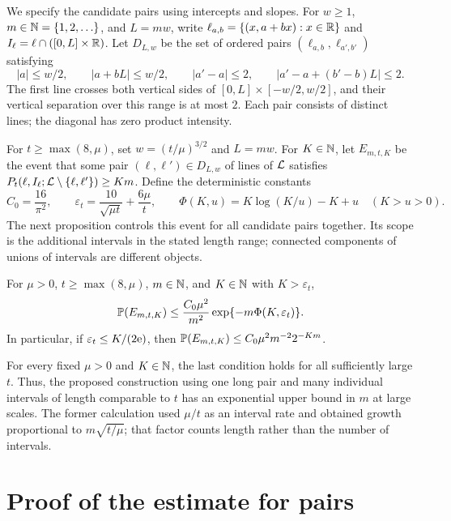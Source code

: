 \documentclass[11pt,letterpaper]{article}
\begin{document}
We specify the candidate pairs using intercepts and slopes. For $w\ge1$, $m\in\N=\{1,2,\ldots\}$, and $L=mw$, write $\ell_{a,b}=\{(x,a+bx):x\in\R\}$ and $I_\ell=\ell\cap([0,L]\times\R)$. Let $D_{L,w}$ be the set of ordered pairs $(\ell_{a,b},\ell_{a',b'})$ satisfying
\begin{equation}\label{eq:pairs}
 |a|\le w/2,\qquad |a+bL|\le w/2,\qquad
 |a'-a|\le2,\qquad |a'-a+(b'-b)L|\le2.
\end{equation}
The first line crosses both vertical sides of $[0,L]\times[-w/2,w/2]$, and their vertical separation over this range is at most $2$. Each pair consists of distinct lines; the diagonal has zero product intensity.

For $t\ge\max(8,\mu)$, set $w=(t/\mu)^{3/2}$ and $L=mw$. For $K\in\N$, let $E_{m,t,K}$ be the event that some pair $(\ell,\ell')\in D_{L,w}$ of lines of $\cL$ satisfies $P_t(\ell,I_\ell;\cL\setminus\{\ell,\ell'\})\ge Km$. Define the deterministic constants
\[
 C_0=\frac{16}{\pi^2},\qquad
 \varepsilon_t=\frac{10}{\sqrt{\mu t}}+\frac{6\mu}{t},\qquad
 \Phi(K,u)=K\log(K/u)-K+u\quad (K>u>0).
\]
The next proposition controls this event for all candidate pairs together. Its scope is the additional intervals in the stated length range; connected components of unions of intervals are different objects.

\begin{proposition}\label{prop:pair}
For $\mu>0$, $t\ge\max(8,\mu)$, $m\in\N$, and $K\in\N$ with $K>\varepsilon_t$,
\begin{equation}\label{eq:main}
 \P(E_{m,t,K})\le \frac{C_0\mu^2}{m^2}
                   \exp\{-m\Phi(K,\varepsilon_t)\}.
\end{equation}
In particular, if $\varepsilon_t\le K/(2\e)$, then
$\P(E_{m,t,K})\le C_0\mu^2m^{-2}2^{-Km}$.
\end{proposition}

For every fixed $\mu>0$ and $K\in\N$, the last condition holds for all sufficiently large $t$. Thus, the proposed construction using one long pair and many individual intervals of length comparable to $t$ has an exponential upper bound in $m$ at large scales. The former calculation used $\mu/t$ as an interval rate and obtained growth proportional to $m\sqrt{t/\mu}$; that factor counts length rather than the number of intervals.

\section{Proof of the estimate for pairs}
\end{document}
